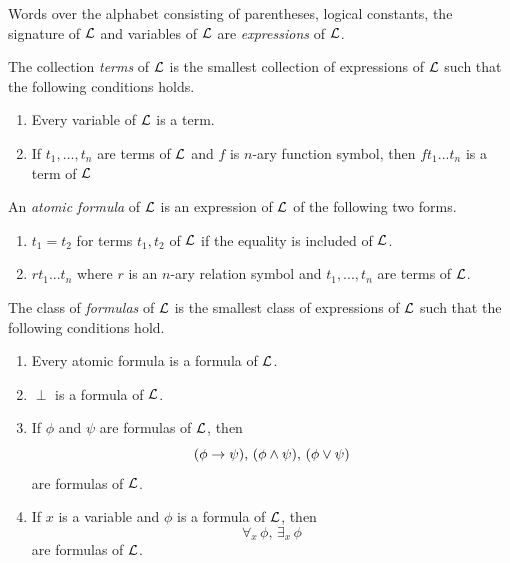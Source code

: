 \documentclass[10pt]{amsart}
\begin{document}
\begin{definition}
	Words over the alphabet consisting of parentheses, logical constants, the signature of ${\mathcal L}$ and variables of ${\mathcal L}$ are \textit{expressions} of ${\mathcal L}$.
\end{definition}

\begin{definition}
	The collection \textit{terms} of ${\mathcal L}$ is the smallest collection of expressions of ${\mathcal L}$ such that the following conditions holds.
	\begin{enumerate}[label=\textbf{(\arabic*)}, leftmargin=3.0em]
		\item Every variable of ${\mathcal L}$ is a term.
		\item If $t_1,...,t_n$ are terms of ${\mathcal L}$ and $f$ is $n$-ary function symbol, then $ft_1...t_n$ is a term of ${\mathcal L}$
	\end{enumerate}
\end{definition}

\begin{definition}
	An \textit{atomic formula} of ${\mathcal L}$ is an expression of ${\mathcal L}$ of the following two forms.
	\begin{enumerate}[label=\textbf{(\arabic*)}, leftmargin=3.0em]
		\item $t_1 = t_2$ for terms $t_1,t_2$ of ${\mathcal L}$ if the equality is included of ${\mathcal L}$.
		\item $rt_1...t_n$ where $r$ is an $n$-ary relation symbol and $t_1, ...,t_n$ are terms of ${\mathcal L}$.
	\end{enumerate}
\end{definition}

\begin{definition}
	The class of \textit{formulas} of ${\mathcal L}$ is the smallest class of expressions of ${\mathcal L}$ such that the following conditions hold.
	\begin{enumerate}[label=\textbf{(\arabic*)}, leftmargin=3.0em]
		\item Every atomic formula is a formula of ${\mathcal L}$.
		\item $\perp$ is a formula of ${\mathcal L}$.
		\item If $\phi$ and $\psi$ are formulas of ${\mathcal L}$, then
		      $$(\phi\rightarrow \psi),\,(\phi \wedge \psi),\,(\phi \vee \psi)$$
		      are formulas of ${\mathcal L}$.
		\item If $x$ is a variable and $\phi$ is a formula of ${\mathcal L}$, then
		      $$\forall_x\,\phi,\,\exists_x\,\phi$$
		      are formulas of ${\mathcal L}$.
	\end{enumerate}
\end{definition}
\end{document}
